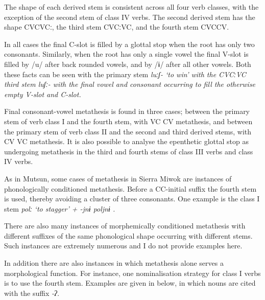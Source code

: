 The shape of each derived stem is consistent across all four verb classes,
with the exception of the second stem of class IV verbs.
The second derived stem has the shape CVCVCː,
the third stem CVCːVC, and the fourth stem CVCCV.

In all cases the final C-slot is filled by a glottal stop
when the root has only two consonants.
Similarly, when the root has only a single vowel the final V-slot is filled
by /u/ after back rounded vowels,
and by /ɨ/ after all other vowels.
Both these facts can be seen with the primary stem \it{luːʃ-} `to win'
with the CVCːVC third stem \it{luʃː-}
with the final vowel and consonant
occurring to fill the otherwise empty V-slot and C-slot.

Final consonant-vowel metathesis is found in three cases;
between the primary stem of verb class I and the fourth stem,
with VC {\ra} CV metathesis,
and between the primary stem of verb class II
and the second and third derived stems,
with CV {\ra} VC metathesis.
It is also possible to analyse the epenthetic glottal stop as undergoing metathesis
in the third and fourth stems of class III verbs and class IV verbs.

As in Mutsun, some cases of metathesis in Sierra Miwok 
are instances of phonologically conditioned metathesis.
Before a CC-initial suffix the fourth stem is used,
thereby avoiding a cluster of three consonants.
One example is the class I stem \it{polː}
`to stagger' + \it{-jnɨ} 
{\ra} \it{poljnɨ} \citep[116]{fr51}.

There are also many instances of morphemically conditioned metathesis
with different suffixes of the same phonological shape occurring with different stems.
Such instances are extremely numerous and I do not provide examples here.

In addition there are also instances
in which metathesis alone serves a morphological function.
For instance, one nominalisation strategy
for class I verbs is to use the fourth stem.
Examples are given in  below,
in which nouns are cited with the  suffix \it{-ʔ}.

